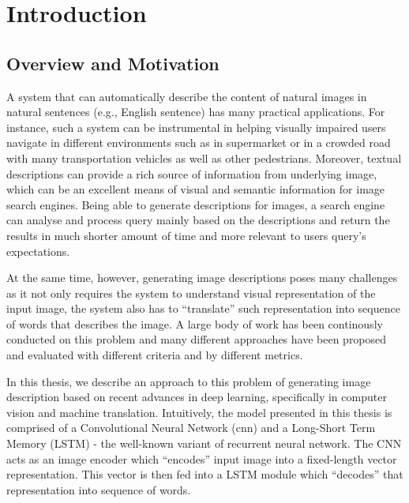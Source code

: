 \chapter{Introduction}

\section{Overview and Motivation}
A system that can automatically describe the content of natural images in natural sentences (e.g., English sentence) has many practical applications. For instance, such a system can be instrumental in helping visually impaired users navigate in different environments such as in supermarket or in a crowded road with many transportation vehicles as well as other pedestrians. Moreover, textual descriptions can provide a rich source of information from underlying image, which can be an excellent means of visual and semantic information for image search engines. Being able to generate descriptions for images, a search engine can analyse and process query mainly based on the descriptions and return the results in much shorter amount of time and more relevant to users query's expectations.

At the same time, however, generating image descriptions poses many challenges as it not only requires the system to understand visual representation of the input image, the system also has to ``translate'' such representation into sequence of words that describes the image. A large body of work has been continously conducted on this problem and many different approaches have been proposed and evaluated with different criteria and by different metrics.

In this thesis, we describe an approach to this problem of generating image description based on recent advances in deep learning, specifically in computer vision and machine translation. Intuitively, the model presented in this thesis is comprised of a Convolutional Neural Network (\gls{cnn}) and a Long-Short Term Memory (LSTM) - the well-known variant of recurrent neural network. The CNN acts as an image encoder which ``encodes'' input image into a fixed-length vector representation. This vector is then fed into a LSTM module which ``decodes'' that representation into sequence of words.

